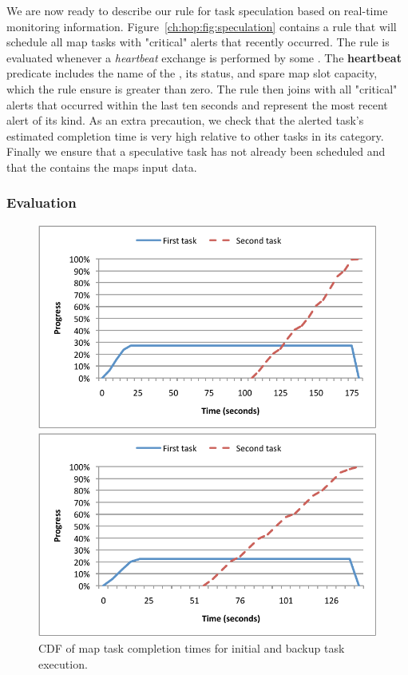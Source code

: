 We are now ready to describe our rule for task speculation based on real-time monitoring information. 
Figure~\ref{ch:hop:fig:speculation} contains a rule that will schedule all map tasks with "critical" alerts
that recently occurred. The rule is evaluated whenever a {\em heartbeat} exchange is performed by
some \TT. The {\bf heartbeat} predicate includes the name of the \TT, its status, and spare map slot capacity, which
the rule ensure is greater than zero. The rule then joins with all "critical" alerts that occurred within the last
ten seconds and represent the most recent alert of its kind. As an extra precaution, we check that the alerted task's
estimated completion time is very high relative to other tasks in its category. Finally we ensure that a speculative
task has not already been scheduled and that the \TT contains the maps input data. 


\subsubsection{Evaluation}

\begin{figure}[t]
\ssp
\begin{minipage}{0.5\linewidth}
  \centering
        \includegraphics[width=0.90\linewidth]{figures/taskSpecPolicy_vanilla}
\end{minipage}
\begin{minipage}{0.5\linewidth}
  \centering
        \includegraphics[width=0.90\linewidth]{figures/taskSpecPolicy_hop}
\end{minipage}
\caption{CDF of map task completion times for initial and backup task execution.}
\label{fig:taskSpecPolicy}
\end{figure}

